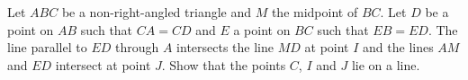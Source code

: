 Let $ABC$ be a non-right-angled triangle and $M$ the midpoint of $BC$. Let $D$ be a point on $AB$ such that $CA=CD$ and $E$ a point on $BC$ such that $EB=ED$. The line parallel to $ED$ through $A$ intersects the line $MD$ at point $I$ and the lines $AM$ and $ED$ intersect at point $J$. Show that the points $C$, $I$ and $J$ lie on a line.